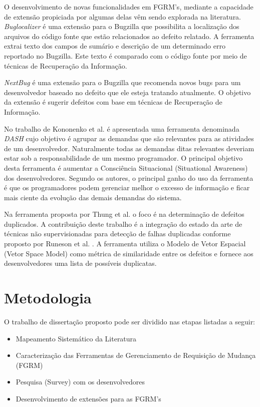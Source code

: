 \documentclass[msc,proposal,hidelot,hideabstract]{ppgccufmg} %
\begin{document}
O desenvolvimento de novas funcionalidades em FGRM's, mediante a capacidade de
extensão propiciada por algumas delas vêm sendo explorada na literatura. \textit{Buglocalizer} \cite{Thung:2014:BIT:2635868.2661678} é uma extensão para o Bugzilla que possibilita a localização dos arquivos do código fonte que estão relacionados ao defeito relatado. A ferramenta extrai texto dos campos de sumário e descrição de um determinado erro reportado no Bugzilla. Este texto é comparado com o código fonte por meio de técnicas de Recuperação da Informação.

\textit{NextBug} \cite{101186} é uma extensão para o Bugzilla que
recomenda novos bugs para um desenvolvedor baseado no defeito que ele esteja
tratando atualmente. O objetivo da extensão é sugerir defeitos com base em técnicas de
Recuperação de Informação.

No trabalho de Kononenko et al. \cite{Kononenko:2014:DED:2591062.2591075} é
apresentada uma ferramenta denominada \textit{DASH} cujo objetivo é agrupar as
demandas que são relevantes para as atividades de um desenvolvedor. Naturalmente todas as demandas ditas relevantes deveriam estar sob a responsabilidade de um mesmo programador. O principal objetivo desta ferramenta é aumentar a Consciência Situacional (Situational Awareness) dos
desenvolvedores. Segundo os autores, o principal ganho do uso da ferramenta é
que os programadores podem gerenciar melhor o excesso de informação e ficar
mais ciente da evolução das demais demandas do sistema.

Na ferramenta proposta por Thung et al. \cite{Thung:2014:DIT:2642937.2648627} o
foco é na determinação de defeitos duplicados. A contribuição deste trabalho é a
integração do estado da arte de técnicas não supervisionadas para detecção de
falhas duplicadas conforme proposto por Runeson et al. \cite{Runeson:2007:DDD:1248820.1248882}. A ferramenta utiliza o Modelo de Vetor Espacial (Vetor Space Model) como métrica de similaridade entre os defeitos e fornece aos desenvolvedores uma lista de possíveis duplicatas.

\chapter{Metodologia}
\label{ch:metodologia}

O trabalho de dissertação proposto pode ser dividido nas etapas listadas a seguir:


	\begin{itemize}[(i)]
		\item Mapeamento Sistemático da Literatura \cite{keele2007guidelines}
		\item Caracterização das Ferramentas de Gerenciamento de Requisição de Mudança (FGRM)
		\item Pesquisa (Survey) com os desenvolvedores \cite{wohlin2012experimentation}
		\item Desenvolvimento de extensões para as FGRM's
	\end{itemize}
\end{document}
